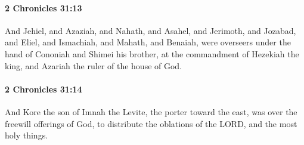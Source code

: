 		\paragraph{2 Chronicles 31:13} %
			\label{2CHRONICLES-31-13}

			And Jehiel, and Azaziah, and Nahath, and Asahel, and Jerimoth, and Jozabad, and Eliel, and Ismachiah, and Mahath, and Benaiah, were overseers under the hand of Cononiah and Shimei his brother, at the commandment of Hezekiah the king, and Azariah the ruler of the house of God.


		\paragraph{2 Chronicles 31:14} %
			\label{2CHRONICLES-31-14}

			And Kore the son of Imnah the Levite, the porter toward the east, was over the freewill offerings of God, to distribute the oblations of the LORD, and the most holy things.

